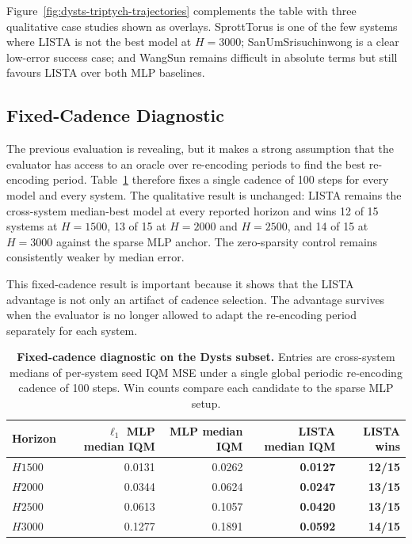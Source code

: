 \documentclass{article}
\begin{document}
Figure~\ref{fig:dysts-triptych-trajectories} complements the table with three qualitative case studies shown as overlays. SprottTorus is one of the few systems where LISTA is not the best model at $H=3000$; SanUmSrisuchinwong is a clear low-error success case; and WangSun remains difficult in absolute terms but still favours LISTA over both MLP baselines. 

\subsection{Fixed-Cadence Diagnostic}

The previous evaluation is revealing, but it makes a strong assumption that the evaluator has access to an oracle over re-encoding periods to find the best re-encoding period. Table~\ref{tab:dysts-fixed-cadence} therefore fixes a single cadence of 100 steps for every model and every system. The qualitative result is unchanged: LISTA remains the cross-system median-best model at every reported horizon and wins 12 of 15 systems at $H=1500$, 13 of 15 at $H=2000$ and $H=2500$, and 14 of 15 at $H=3000$ against the sparse MLP anchor. The zero-sparsity control remains consistently weaker by median error.

This fixed-cadence result is important because it shows that the LISTA advantage is not only an artifact of cadence selection. The advantage survives when the evaluator is no longer allowed to adapt the re-encoding period separately for each system.

\begin{table}[ht]
\centering
\scriptsize
\setlength{\tabcolsep}{5pt}
\begin{tabular}{lrrrr}
\toprule
Horizon & $\ell_1$ MLP median IQM & MLP median IQM & LISTA median IQM & LISTA wins \\
\midrule
$H1500$ & 0.0131 & 0.0262 & \textbf{0.0127}  & \textbf{12/15} \\
$H2000$ & 0.0344 & 0.0624 & \textbf{0.0247} & \textbf{13/15} \\
$H2500$ & 0.0613 & 0.1057 & \textbf{0.0420} & \textbf{13/15} \\
$H3000$ & 0.1277 & 0.1891 & \textbf{0.0592} & \textbf{14/15} \\
\bottomrule
\end{tabular}
\caption{\textbf{Fixed-cadence diagnostic on the Dysts subset.} Entries are cross-system medians of per-system seed IQM MSE under a single global periodic re-encoding cadence of 100 steps. Win counts compare each candidate to the sparse MLP setup.}
\label{tab:dysts-fixed-cadence}
\end{table}
\end{document}
